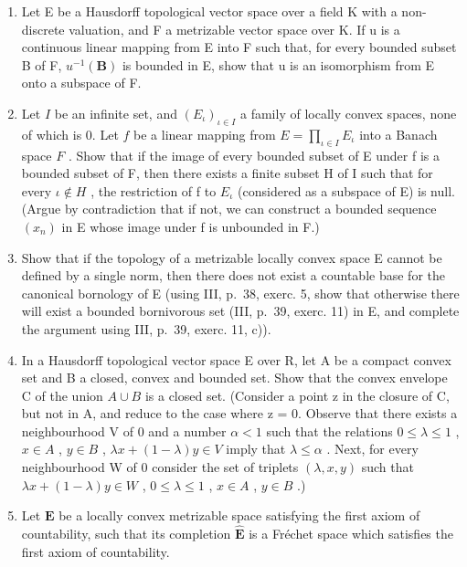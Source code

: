 \begin{enumerate}
\def\labelenumi{\arabic{enumi})}
\setcounter{enumi}{11}
\item
  Let E be a Hausdorff topological vector space over a field K with a non-discrete valuation, and F a metrizable vector space over K. If u is a continuous linear mapping from E into F such that, for every bounded subset B of F, \(u^{-1}(\mathbf{B})\) is bounded in E, show that u is an isomorphism from E onto a subspace of F.
\item
  Let \(I\) be an infinite set, and \((E_{\iota})_{\iota\in I}\) a family of locally convex spaces, none of which is 0. Let \(f\) be a linear mapping from \(E = \prod_{\iota\in I}E_{\iota}\) into a Banach space \(F\) . Show that if the image of every bounded subset of E under f is a bounded subset of F, then there exists a finite subset H of I such that for every \(\iota \notin H\) , the restriction of f to \(E_{\iota}\) (considered as a subspace of E) is null. (Argue by contradiction that if not, we can construct a bounded sequence \((x_{n})\) in E whose image under f is unbounded in F.)
\item
  Show that if the topology of a metrizable locally convex space E cannot be defined by a single norm, then there does not exist a countable base for the canonical bornology of E (using III, p.~38, exerc. 5, show that otherwise there will exist a bounded bornivorous set (III, p.~39, exerc. 11) in E, and complete the argument using III, p.~39, exerc. 11, c)).
\item
  In a Hausdorff topological vector space E over R, let A be a compact convex set and B a closed, convex and bounded set. Show that the convex envelope C of the union \(A \cup B\) is a closed set. (Consider a point z in the closure of C, but not in A, and reduce to the case where z = 0. Observe that there exists a neighbourhood V of 0 and a number \(\alpha < 1\) such that the relations \(0 \leqslant \lambda \leqslant 1\) , \(x \in A\) , \(y \in B\) , \(\lambda x + (1 - \lambda)y \in V\) imply that \(\lambda \leqslant \alpha\) . Next, for every neighbourhood W of 0 consider the set of triplets \((\lambda, x, y)\) such that \(\lambda x + (1 - \lambda)y \in W\) , \(0 \leqslant \lambda \leqslant 1\) , \(x \in A\) , \(y \in B\) .)
\item
  Let \(\mathbf{E}\) be a locally convex metrizable space satisfying the first axiom of countability, such that its completion \(\hat{\mathbf{E}}\) is a Fréchet space which satisfies the first axiom of countability.
\end{enumerate}

